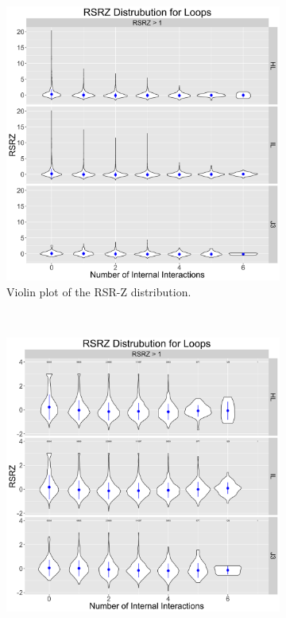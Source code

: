 \begin{figure}
  \begin{subfigure}[b]{0.45\textwidth}
    \includegraphics[width=\textwidth]{chapter-5/figs/loops/a}
    \caption{Violin plot of the RSR-Z distribution.}
    \label{fig:rsrz-dist}
  \end{subfigure}
  ~
  \begin{subfigure}[b]{0.45\textwidth}
    \includegraphics[width=\textwidth]{chapter-5/figs/loops/b}

\end{subfigure}
\end{figure}

